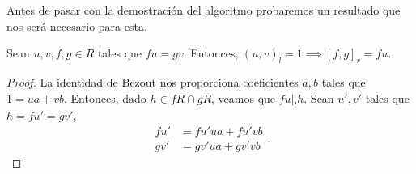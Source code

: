 Antes de pasar con la demostración del algoritmo probaremos un resultado que nos será necesario para esta.

\begin{proposition}
    Sean \(u,v,f,g \in R\) tales que \(fu = gv\). Entonces,  \({(u,v)}_{l} = 1 \implies {[f,g]}_r = fu\).
\end{proposition}

\begin{proof}
    La identidad de Bezout nos proporciona coeficientes \(a, b\) tales que \(1 = ua + vb\). Entonces, dado \(h \in fR \cap gR\), veamos que \(fu |_{l} h\). Sean \(u', v'\) tales que \(h = fu' = gv'\),
    \[
    \begin{aligned}
        fu' &= fu'ua + fu'vb \\
        gv' &= gv'ua + gv'vb
    \end{aligned}
    .\]
\end{proof}

